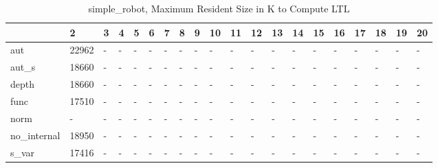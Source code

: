 \begin{table}
\caption{simple_robot, Maximum Resident Size in K to Compute LTL}
\label{simple_robot_LTL_size}
\begin{tabular}{llllllllllllllllllll}
\toprule
 & 2 & 3 & 4 & 5 & 6 & 7 & 8 & 9 & 10 & 11 & 12 & 13 & 14 & 15 & 16 & 17 & 18 & 19 & 20 \\
\midrule
aut & 22962 & - & - & - & - & - & - & - & - & - & - & - & - & - & - & - & - & - & - \\
aut_s & 18660 & - & - & - & - & - & - & - & - & - & - & - & - & - & - & - & - & - & - \\
depth & 18660 & - & - & - & - & - & - & - & - & - & - & - & - & - & - & - & - & - & - \\
func & 17510 & - & - & - & - & - & - & - & - & - & - & - & - & - & - & - & - & - & - \\
norm & - & - & - & - & - & - & - & - & - & - & - & - & - & - & - & - & - & - & - \\
no_internal & 18950 & - & - & - & - & - & - & - & - & - & - & - & - & - & - & - & - & - & - \\
s_var & 17416 & - & - & - & - & - & - & - & - & - & - & - & - & - & - & - & - & - & - \\
\bottomrule
\end{tabular}
\end{table}

